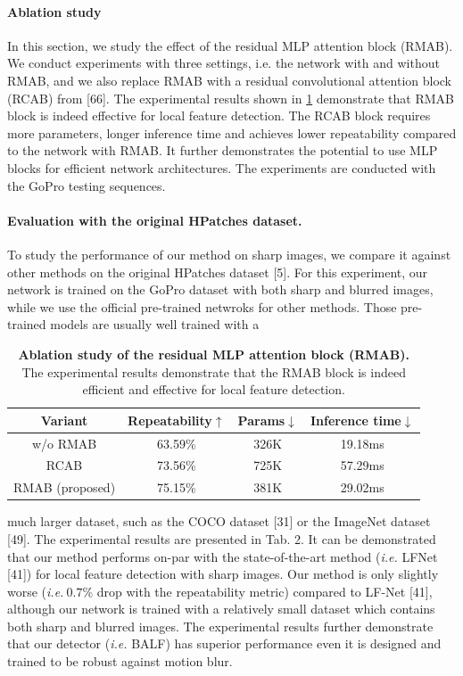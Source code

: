 \documentclass[10pt,twocolumn,letterpaper]{article}
\begin{document}
\paragraph{Ablation study}
In this section, we study the effect of the
residual MLP attention block (RMAB). We conduct experiments with three settings, i.e. the network with and without RMAB, and we also replace RMAB with a residual convolutional attention block (RCAB) from [66]. The experimental results shown in \cref{tab:tab1} demonstrate that RMAB block
is indeed effective for local feature detection. The RCAB
block requires more parameters, longer inference time and
achieves lower repeatability compared to the network with
RMAB. It further demonstrates the potential to use MLP
blocks for efficient network architectures. The experiments
are conducted with the GoPro testing sequences.

\paragraph{Evaluation with the original HPatches dataset.}
To study the performance of our method on sharp images, we
compare it against other methods on the original HPatches
dataset [5]. For this experiment, our network is trained on
the GoPro dataset with both sharp and blurred images, while
we use the official pre-trained netwroks for other methods.
Those pre-trained models are usually well trained with a

\begin{table}[H]
    \centering
    \begin{tabular}{cccc} %
         \hline
         Variant & Repeatability$\uparrow$ & Params$\downarrow$ & Inference time$\downarrow$\\
         \hline
         w/o RMAB & 63.59\% & 326K & 19.18ms \\
         RCAB & 73.56\% & 725K & 57.29ms\\
         RMAB (proposed) & 75.15\% & 381K & 29.02ms\\
         \hline
    \end{tabular}
    \caption{\textbf{Ablation study of the residual MLP attention block
(RMAB).} The experimental results demonstrate that the RMAB
block is indeed efficient and effective for local feature detection.}
    \label{tab:tab1}
\end{table}
\noindent much larger dataset, such as the COCO dataset [31] or the
ImageNet dataset [49]. The experimental results are presented in Tab. 2. It can be demonstrated that our method
performs on-par with the state-of-the-art method (\textit{i.e.} LFNet [41]) for local feature detection with sharp images. Our
method is only slightly worse (\textit{i.e.}$~0.7\%$ drop with the repeatability metric) compared to LF-Net [41], although our
network is trained with a relatively small dataset which contains both sharp and blurred images. The experimental results further demonstrate that our detector (\textit{i.e.} BALF) has
superior performance even it is designed and trained to be
robust against motion blur.
\end{document}
